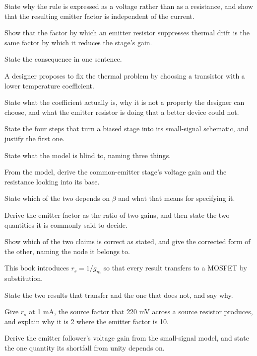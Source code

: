 State why the rule is expressed as a voltage rather than as a resistance, and show that the resulting emitter factor is independent of the current.

 Show that the factor by which an emitter resistor suppresses thermal drift is the same factor by which it reduces the stage's gain.

State the consequence in one sentence.

 A designer proposes to fix the thermal problem by choosing a transistor with a lower temperature coefficient.

State what the coefficient actually is, why it is not a property the designer can choose, and what the emitter resistor is doing that a better device could not.

\label{exb:q:7}

 State the four steps that turn a biased stage into its small-signal schematic, and justify the first one.

State what the model is blind to, naming three things.

 From the model, derive the common-emitter stage's voltage gain and the resistance looking into its base.

State which of the two depends on $\beta$ and what that means for specifying it.

 Derive the emitter factor as the ratio of two gains, and then state the two quantities it is commonly said to decide.

Show which of the two claims is correct as stated, and give the corrected form of the other, naming the node it belongs to.

 This book introduces $r_s = 1/g_m$ so that every result transfers to a MOSFET by substitution.

State the two results that transfer and the one that does not, and say why.

Give $r_s$ at 1 mA, the source factor that 220 mV across a source resistor produces, and explain why it is 2 where the emitter factor is 10.

\label{exb:q:8}

 Derive the emitter follower's voltage gain from the small-signal model, and state the one quantity its shortfall from unity depends on.

